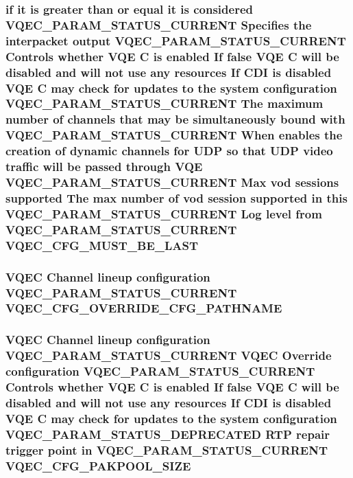 \subsubsection{\setlength{\rightskip}{0pt plus 5cm}if it is greater than or equal it is considered VQEC\_\-PARAM\_\-STATUS\_\-CURRENT Specifies the interpacket output VQEC\_\-PARAM\_\-STATUS\_\-CURRENT Controls whether VQE \bf{C} is enabled If false VQE \bf{C} will be disabled and will not use any resources If CDI is disabled VQE \bf{C} may check for updates \bf{to} the system configuration VQEC\_\-PARAM\_\-STATUS\_\-CURRENT The maximum number of \bf{channels} that may be simultaneously bound with VQEC\_\-PARAM\_\-STATUS\_\-CURRENT When enables the creation of dynamic \bf{channels} for UDP so that UDP video traffic will be passed through VQE VQEC\_\-PARAM\_\-STATUS\_\-CURRENT Max vod sessions supported The max number of vod session supported in \bf{this} VQEC\_\-PARAM\_\-STATUS\_\-CURRENT Log level from VQEC\_\-PARAM\_\-STATUS\_\-CURRENT \bf{VQEC\_\-CFG\_\-MUST\_\-BE\_\-LAST}}\label{vqec__cfg__settings_8h_2a5ca37b951675be7dd048703f90aae0}


\subsubsection{\setlength{\rightskip}{0pt plus 5cm}VQEC Channel lineup configuration VQEC\_\-PARAM\_\-STATUS\_\-CURRENT \bf{VQEC\_\-CFG\_\-OVERRIDE\_\-CFG\_\-PATHNAME}}\label{vqec__cfg__settings_8h_6c18445f211489730df2673cf1e22b71}


\subsubsection{\setlength{\rightskip}{0pt plus 5cm}VQEC Channel lineup configuration VQEC\_\-PARAM\_\-STATUS\_\-CURRENT VQEC Override configuration VQEC\_\-PARAM\_\-STATUS\_\-CURRENT Controls whether VQE \bf{C} is enabled If false VQE \bf{C} will be disabled and will not use any resources If CDI is disabled VQE \bf{C} may check for updates \bf{to} the system configuration VQEC\_\-PARAM\_\-STATUS\_\-DEPRECATED RTP repair trigger point in VQEC\_\-PARAM\_\-STATUS\_\-CURRENT \bf{VQEC\_\-CFG\_\-PAKPOOL\_\-SIZE}}\label{vqec__cfg__settings_8h_8a26779d9e26bb712cd9125ddcd12d18}


